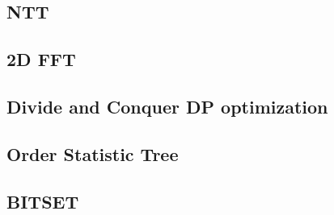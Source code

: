 \documentclass[10pt,landscape,a4paper,twocolumn]{article}
\begin{document}
\subsection{NTT}


\subsection{2D FFT}


\subsection{Divide and Conquer DP optimization}


\subsection{Order Statistic Tree}


\subsection{BITSET}



\clearpage
\null
\clearpage
\null
\clearpage
\null
\clearpage
\null
\clearpage
\null
\end{document}
